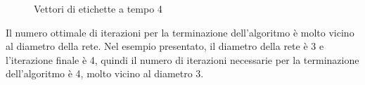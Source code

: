 \documentclass[a4paper,12pt]{report}
\begin{document}
		\begin{center}
			\begin{figure}[H]
				\centering
				\qquad
				\qquad
				\qquad

				\caption{Vettori di etichette a tempo 4}
			\end{figure}
		\end{center}

		Il numero ottimale di iterazioni per la terminazione dell'algoritmo è molto vicino al diametro della rete. Nel esempio presentato, il diametro della rete è 3 e l'iterazione finale è 4, quindi il numero di iterazioni necessarie per la terminazione dell'algoritmo è 4, molto vicino al diametro 3.
\end{document}
